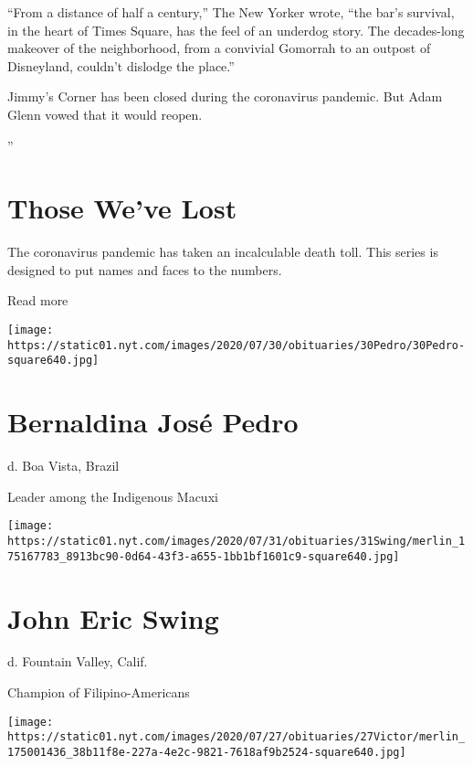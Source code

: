 ``From a distance of half a century,'' The New Yorker wrote, ``the bar's
survival, in the heart of Times Square, has the feel of an underdog
story. The decades-long makeover of the neighborhood, from a convivial
Gomorrah to an outpost of Disneyland, couldn't dislodge the place.''

Jimmy's Corner has been closed during the coronavirus pandemic. But Adam
Glenn vowed that it would reopen.

''

\href{https://www.nytimes.com/interactive/2020/obituaries/people-died-coronavirus-obituaries.html?action=click\&pgtype=Article\&state=default\&region=BELOW_MAIN_CONTENT\&context=covid_obits_promo}{}

\hypertarget{those-weve-lost}{%
\section{Those We've Lost}\label{those-weve-lost}}

The coronavirus pandemic has taken an incalculable death toll. This
series is designed to put names and faces to the numbers.

Read more

\texttt{[image: https://static01.nyt.com/images/2020/07/30/obituaries/30Pedro/30Pedro-square640.jpg]}

\hypertarget{bernaldina-josuxe9-pedro}{%
\section{Bernaldina José Pedro}\label{bernaldina-josuxe9-pedro}}

d. Boa Vista, Brazil

Leader among the Indigenous Macuxi

\texttt{[image: https://static01.nyt.com/images/2020/07/31/obituaries/31Swing/merlin\_175167783\_8913bc90-0d64-43f3-a655-1bb1bf1601c9-square640.jpg]}

\hypertarget{john-eric-swing}{%
\section{John Eric Swing}\label{john-eric-swing}}

d. Fountain Valley, Calif.

Champion of Filipino-Americans

\texttt{[image: https://static01.nyt.com/images/2020/07/27/obituaries/27Victor/merlin\_175001436\_38b11f8e-227a-4e2c-9821-7618af9b2524-square640.jpg]}

